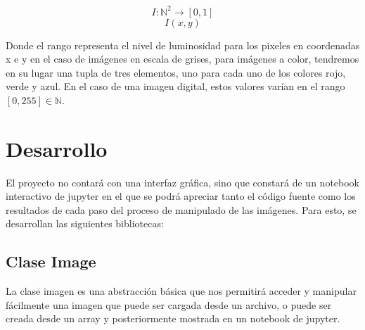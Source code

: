 \documentclass[letter]{article}
\begin{document}
$$ I:\mathbb N^2 \rightarrow [0, 1] $$
$$ I(x, y) $$

Donde el rango representa el nivel de luminosidad para los pixeles en
coordenadas x e y en el caso de imágenes en escala de grises, para imágenes a
color, tendremos en su lugar una tupla de tres elementos, uno para cada uno de
los colores rojo, verde y azul. En el caso de una imagen digital, estos valores
varían en el rango \([0,255]\in \mathbb N\).

\section{Desarrollo}
\label{sec:orgf97f44b}
El proyecto no contará con una interfaz gráfica, sino que constará de un
notebook interactivo de jupyter en el que se podrá apreciar tanto el código
fuente como los resultados de cada paso del proceso de manipulado de las
imágenes. Para esto, se desarrollan las siguientes bibliotecas:

\subsection{Clase Image}
\label{sec:org19052f4}
La clase imagen es una abstracción básica que nos permitirá acceder y manipular
fácilmente una imagen que puede ser cargada desde un archivo, o puede ser creada
desde un array y posteriormente mostrada en un notebook de jupyter.
\end{document}
